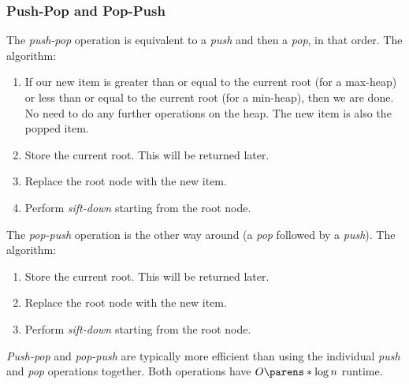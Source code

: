 \subsubsection{Push-Pop and Pop-Push}

\begin{OpSectionSummary}
    \OpSigSep{}
\end{OpSectionSummary}

The \emph{push-pop} operation is equivalent to a \emph{push} and then a \emph{pop}, in that order. The algorithm:
\begin{enumerate}
    \item If our new item is greater than or equal to the current root (for a max-heap) or less than or equal to the current root (for a min-heap), then we are done. No need to do any further operations on the heap. The new item is also the popped item.
    \item Store the current root. This will be returned later.
    \item Replace the root node with the new item.
    \item Perform \emph{sift-down} starting from the root node.
\end{enumerate}

The \emph{pop-push} operation is the other way around (a \emph{pop} followed by a \emph{push}). The algorithm: %
\begin{enumerate}
    \item Store the current root. This will be returned later.
    \item Replace the root node with the new item.
    \item Perform \emph{sift-down} starting from the root node.
\end{enumerate}

\emph{Push-pop} and \emph{pop-push} are typically more efficient than using the individual \emph{push} and \emph{pop} operations together. Both operations have $O \parens*{\log{n}}$ runtime.

